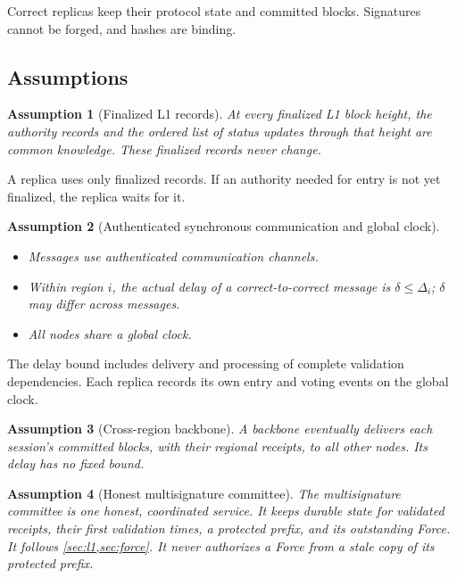\documentclass[11pt,a4paper]{article}
\newtheorem{assumption}[assumption]{Assumption}
\newcounter{protocol}
\begin{document}
Correct replicas keep their protocol state and committed blocks.
Signatures cannot be forged, and hashes are binding.

\subsection{Assumptions}
\label{sec:assumptions}
\begin{assumption}[Finalized L1 records]
\label{ass:authority}
At every finalized L1 block height, the authority records and the ordered
list of status updates through that height are common knowledge. These
finalized records never change.
\end{assumption}
A replica uses only finalized records. If an authority needed for entry
is not yet finalized, the replica waits for it.

\begin{assumption}[Authenticated synchronous communication and global clock]
\label{ass:network}
\leavevmode\par
\begin{itemize}
\item Messages use authenticated communication channels.
\item Within region $i$, the actual delay of a correct-to-correct
message is $\delta\le\Delta_i$; $\delta$ may differ across messages.
\item All nodes share a global clock.
\end{itemize}
\end{assumption}
The delay bound includes delivery and processing of complete validation
dependencies. Each replica records its own entry and voting events on
the global clock.

\begin{assumption}[Cross-region backbone]
\label{ass:backbone}
A backbone eventually delivers each session's committed blocks, with
their regional receipts, to all other nodes. Its delay has no fixed
bound.
\end{assumption}

\begin{assumption}[Honest multisignature committee]
\label{ass:committee}
The multisignature committee is one honest, coordinated service. It
keeps durable state for validated receipts, their first validation times,
a protected prefix, and its outstanding Force. It follows
\cref{sec:l1,sec:force}. It never authorizes a Force from a stale copy
of its protected prefix.
\end{assumption}
\end{document}
